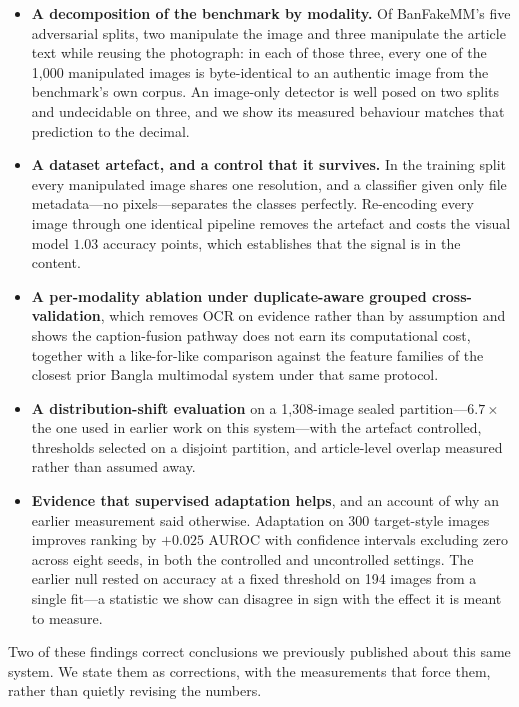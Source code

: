 \documentclass[pdflatex,sn-mathphys-num]{sn-jnl}
\begin{document}
\begin{itemize}
\item \textbf{A decomposition of the benchmark by modality.} Of BanFakeMM's
five adversarial splits, two manipulate the image and three manipulate the
article text while reusing the photograph: in each of those three, every one
of the 1{,}000 manipulated images is byte-identical to an authentic image from
the benchmark's own corpus. An image-only detector is well posed on two splits
and undecidable on three, and we show its measured behaviour matches that
prediction to the decimal.

\item \textbf{A dataset artefact, and a control that it survives.} In the
training split every manipulated image shares one resolution, and a classifier
given only file metadata---no pixels---separates the classes perfectly.
Re-encoding every image through one identical pipeline removes the artefact and
costs the visual model $1.03$ accuracy points, which establishes that the
signal is in the content.

\item \textbf{A per-modality ablation under duplicate-aware grouped
cross-validation}, which removes OCR on evidence rather than by assumption and
shows the caption-fusion pathway does not earn its computational cost, together
with a like-for-like comparison against the feature families of the closest
prior Bangla multimodal system under that same protocol.

\item \textbf{A distribution-shift evaluation} on a 1{,}308-image sealed
partition---$6.7\times$ the one used in earlier work on this system---with the
artefact controlled, thresholds selected on a disjoint partition, and
article-level overlap measured rather than assumed away.

\item \textbf{Evidence that supervised adaptation helps}, and an account of why
an earlier measurement said otherwise. Adaptation on 300 target-style images
improves ranking by $+0.025$ AUROC with confidence intervals excluding zero
across eight seeds, in both the controlled and uncontrolled settings. The
earlier null rested on accuracy at a fixed threshold on 194 images from a
single fit---a statistic we show can disagree in sign with the effect it is
meant to measure.
\end{itemize}

Two of these findings correct conclusions we previously published about this
same system. We state them as corrections, with the measurements that force
them, rather than quietly revising the numbers.
\end{document}
